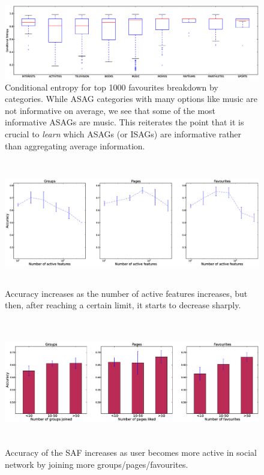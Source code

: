 \begin{figure}[tbp!]
\hspace{-12mm}\includegraphics[width=200mm]{data/plots/boxPlots/CEvsFavTypes.eps}
\vspace{-7mm}
\caption{Conditional entropy for top 1000 favourites breakdown by categories.  While ASAG categories
with many options like music are not informative on average, we see
that some of the most informative ASAGs are music.  This reiterates
the point that it is crucial to \emph{learn} which ASAGs (or ISAGs)
are informative rather than aggregating average information.}
\label{Fig5}
\end{figure}

\begin{figure}[tbp!]
\centering
\includegraphics[width=180mm, height=55mm]{data/plots/new/accuracyVsactiveFeatures.eps}
\vspace{-3mm}
\caption{Accuracy increases as the number of active features increases, but then, after reaching a certain limit, it starts to decrease sharply.
}
\label{fig:AccuracyVsactiveFeats}
\end{figure}

\begin{figure}[tbp!]
\centering
\includegraphics[width=180mm, height=55mm]{data/plots/new/accuracyVsmembership.eps}
\vspace{-3mm}
\caption{Accuracy of the SAF increases as user becomes more active in social network by joining more groups/pages/favourites.}
\label{AccuracyVsmembership}
\end{figure}

